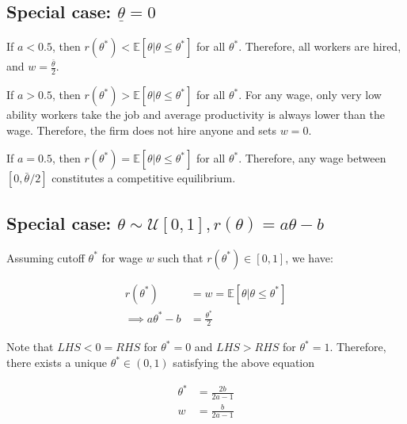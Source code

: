 \subsection*{Special case: $\underline{\theta} = 0$}
If $a < 0.5$, then $r(\theta^*) < \mathbb E [\theta | \theta \le \theta^*] $ for all $\theta^*$. Therefore, all workers are hired, and $w = \frac{\bar \theta}{2}$.

If $a > 0.5$, then $r(\theta^*) > \mathbb E [\theta | \theta \le \theta^*] $ for all $\theta^*$. For any wage, only very low ability workers take the job and average productivity is always lower than the wage. Therefore, the firm does not hire anyone and sets $w = 0$.

If $a = 0.5$, then $r(\theta^*) = \mathbb E [\theta | \theta \le \theta^*] $ for all $\theta^*$. Therefore, any wage between $[0, \bar \theta/2]$ constitutes a competitive equilibrium. 

\subsection*{Special case: $\theta \sim \mathcal U[0,1], r(\theta) = a\theta - b$}

Assuming cutoff $\theta^*$ for wage $w$ such that $r(\theta^*) \in [0, 1]$, we have:

\begin{align*}
    r(\theta^*) &= w = \mathbb E [\theta | \theta \le \theta^*] \\
    \implies a \theta^* - b &= \frac{\theta^* }{2} 
\end{align*}

Note that $LHS < 0 = RHS$ for $\theta^* = 0$ and $LHS > RHS$ for $\theta^* = 1$. Therefore, there exists a unique $\theta^* \in (0,1)$ satisfying the above equation

\begin{align*}
    \theta^* &= \frac{2b}{2a - 1}\\
    w &= \frac{b}{2a-1}
\end{align*}